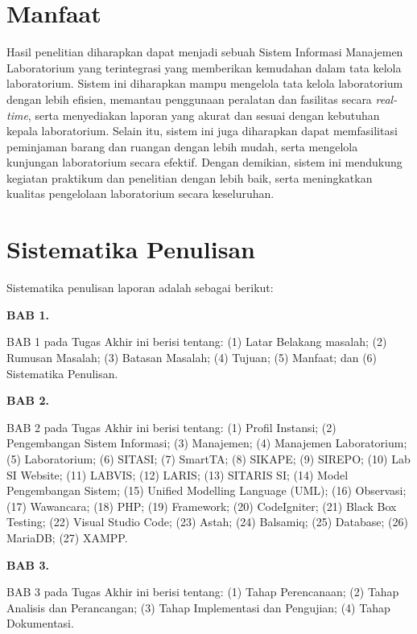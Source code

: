 \section{Manfaat}
Hasil penelitian diharapkan dapat menjadi sebuah Sistem Informasi Manajemen Laboratorium yang terintegrasi yang memberikan kemudahan dalam tata kelola laboratorium. Sistem ini diharapkan mampu mengelola tata kelola laboratorium dengan lebih efisien, memantau penggunaan peralatan dan fasilitas secara \textit{real-time}, serta menyediakan laporan yang akurat dan sesuai dengan kebutuhan kepala laboratorium. Selain itu, sistem ini juga diharapkan dapat memfasilitasi peminjaman barang dan ruangan dengan lebih mudah, serta mengelola kunjungan laboratorium secara efektif. Dengan demikian, sistem ini mendukung kegiatan praktikum dan penelitian dengan lebih baik, serta meningkatkan kualitas pengelolaan laboratorium secara keseluruhan.
\section{Sistematika Penulisan}
Sistematika penulisan laporan adalah sebagai berikut:

\textbf{BAB 1. \babSatu}

BAB 1 pada Tugas Akhir ini berisi tentang: (1) Latar Belakang masalah; (2) Rumusan Masalah; (3) Batasan Masalah; (4) Tujuan; (5) Manfaat; dan (6) Sistematika Penulisan.

\textbf{BAB 2. \babDua}

BAB 2 pada Tugas Akhir ini berisi tentang: (1) Profil Instansi; (2) Pengembangan Sistem Informasi; (3) Manajemen; (4) Manajemen Laboratorium; (5) Laboratorium; (6) SITASI; (7) SmartTA; (8) SIKAPE; (9) SIREPO; (10) Lab SI Website; (11) LABVIS; (12) LARIS; (13) SITARIS SI; (14) Model Pengembangan Sistem; (15) Unified Modelling Language (UML); (16) Observasi; (17) Wawancara; (18) PHP; (19) Framework; (20) CodeIgniter; (21) Black Box Testing; (22) Visual Studio Code; (23) Astah; (24) Balsamiq; (25) Database; (26) MariaDB; (27) XAMPP.

\textbf{BAB 3. \babTiga}

BAB 3 pada Tugas Akhir ini berisi tentang: (1) Tahap Perencanaan; (2) Tahap Analisis dan Perancangan; (3) Tahap Implementasi dan Pengujian; (4) Tahap Dokumentasi.

